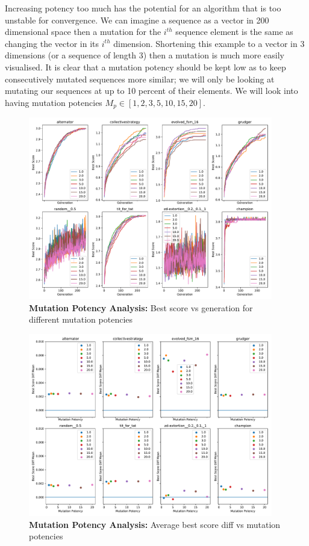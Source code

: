 Increasing potency too much has the potential for an algorithm that is too unstable for convergence. 
We can imagine a sequence as a vector in 200 dimensional space then a mutation for the \(i^{th}\) sequence element is the same as changing the vector in its \(i^{th}\) dimension.
Shortening this example to a vector in 3 dimensions (or a sequence of length 3) then a mutation is much more easily visualised.
It is clear that a mutation potency should be kept low as to keep consecutively mutated sequences more similar;
we will only be looking at mutating our sequences at up to 10 percent of their elements.
We will look into having mutation potencies \(M_p \in [1,2,3,5,10,15,20]\).

\begin{figure}[ht]
    \includegraphics[width=0.95\textwidth, keepaspectratio, center]{./img/plots/MUT_POT_bs_v_gen_all.pdf}
    \caption{\textbf{Mutation Potency Analysis:} Best score vs generation for different mutation potencies}\label{fig:MUT-POT-bs-v-gen-all}
\end{figure}

\begin{figure}[ht]
    \includegraphics[width=0.95\textwidth, keepaspectratio, center]{./img/plots/MUT_POT_bs_diff_v_pot_all.pdf}
    \caption{\textbf{Mutation Potency Analysis:} Average best score diff vs mutation potencies}\label{fig:MUT-POT-bs-diff-v-pot-all}
\end{figure}

